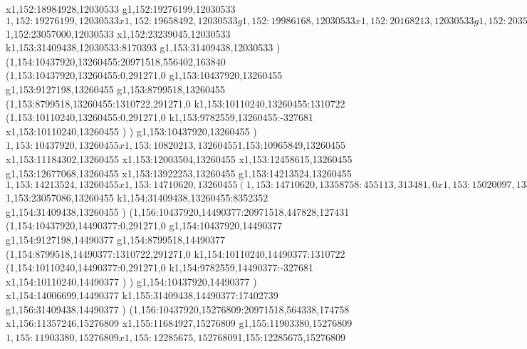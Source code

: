 {x1,152:18984928,12030533
g1,152:19276199,12030533
$1,152:19276199,12030533
x1,152:19658492,12030533
g1,152:19986168,12030533
x1,152:20168213,12030533
g1,152:20350253,12030533
x1,152:20823569,12030533
(1,152:20823569,11792708:305586,318577,0
x1,152:21096387,11792708
)
g1,152:21311195,12030533
x1,152:21966556,12030533
g1,152:22148596,12030533
x1,152:22621912,12030533
[1,152:22621912,12205291:435088,739096,0
(1,152:22621912,11750185:435088,283990,54614
x1,152:23024232,11750185
)
(1,152:22621912,12205291:294003,295640,0
x1,152:22883147,12205291
)
]
$1,152:23057000,12030533
x1,152:23239045,12030533
k1,153:31409438,12030533:8170393
g1,153:31409438,12030533
)
(1,154:10437920,13260455:20971518,556402,163840
(1,153:10437920,13260455:0,291271,0
g1,153:10437920,13260455
g1,153:9127198,13260455
g1,153:8799518,13260455
(1,153:8799518,13260455:1310722,291271,0
k1,153:10110240,13260455:1310722
(1,153:10110240,13260455:0,291271,0
k1,153:9782559,13260455:-327681
x1,153:10110240,13260455
)
)
g1,153:10437920,13260455
)
$1,153:10437920,13260455
x1,153:10820213,13260455
$1,153:10965849,13260455
x1,153:11184302,13260455
x1,153:12003504,13260455
x1,153:12458615,13260455
g1,153:12677068,13260455
x1,153:13922253,13260455
g1,153:14213524,13260455
$1,153:14213524,13260455
x1,153:14710620,13260455
(1,153:14710620,13358758:455113,313481,0
x1,153:15020097,13358758
)
x1,153:16057754,13260455
g1,153:16239794,13260455
x1,153:16931565,13260455
g1,153:17113605,13260455
x1,153:17839051,13260455
g1,153:18021091,13260455
x1,153:18203136,13260455
g1,153:18385176,13260455
x1,153:18767469,13260455
x1,153:19820596,13260455
g1,153:20002636,13260455
x1,153:20512362,13260455
g1,153:20694402,13260455
x1,153:21404378,13260455
g1,153:21586418,13260455
x1,153:22096144,13260455
g1,153:22278184,13260455
x1,153:22751500,13260455
(1,153:22751500,13022630:305586,318577,0
x1,153:23024318,13022630
)
$1,153:23057086,13260455
k1,154:31409438,13260455:8352352
g1,154:31409438,13260455
)
(1,156:10437920,14490377:20971518,447828,127431
(1,154:10437920,14490377:0,291271,0
g1,154:10437920,14490377
g1,154:9127198,14490377
g1,154:8799518,14490377
(1,154:8799518,14490377:1310722,291271,0
k1,154:10110240,14490377:1310722
(1,154:10110240,14490377:0,291271,0
k1,154:9782559,14490377:-327681
x1,154:10110240,14490377
)
)
g1,154:10437920,14490377
)
x1,154:14006699,14490377
k1,155:31409438,14490377:17402739
g1,156:31409438,14490377
)
(1,156:10437920,15276809:20971518,564338,174758
x1,156:11357246,15276809
x1,155:11684927,15276809
g1,155:11903380,15276809
$1,155:11903380,15276809
x1,155:12285675,15276809
$1,155:12285675,15276809
}
